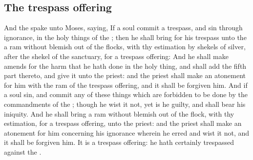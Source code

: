 \begin{biblechapter}
\section*{The trespass offering}
\verse And the \LORD spake unto Moses, saying,
\verse If a soul commit a trespass, and sin through ignorance, in the holy things of the \LORD; then he shall bring for his trespass unto the \LORD a ram without blemish out of the flocks, with thy estimation by shekels of silver, after the shekel of the sanctuary, for a trespass offering:
\verse And he shall make amends for the harm that he hath done in the holy thing, and shall add the fifth part thereto, and give it unto the priest: and the priest shall make an atonement for him with the ram of the trespass offering, and it shall be forgiven him.
\verse And if a soul sin, and commit any of these things which are forbidden to be done by the commandments of the \LORD; though he wist it not, yet is he guilty, and shall bear his iniquity.
\verse And he shall bring a ram without blemish out of the flock, with thy estimation, for a trespass offering, unto the priest: and the priest shall make an atonement for him concerning his ignorance wherein he erred and wist it not, and it shall be forgiven him.
\verse It is a trespass offering: he hath certainly trespassed against the \LORD.
\end{biblechapter}

